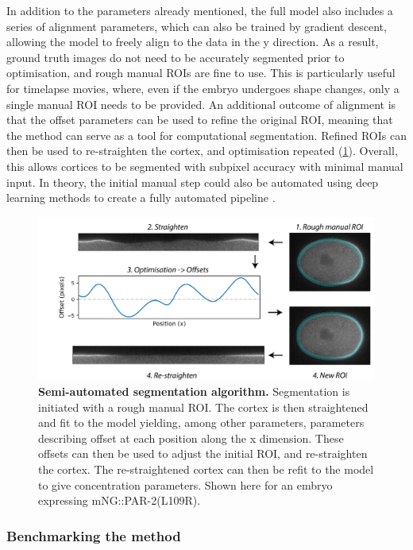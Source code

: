\documentclass[12pt]{"article"}
\newcommand{\mycaption}[2]{\caption[#1]{\textbf{#1.} #2}}
\begin{document}
In addition to the parameters already mentioned, the full model also includes a series of alignment parameters, which can also be trained by gradient descent, allowing the model to freely align to the data in the y direction. As a result, ground truth images do not need to be accurately segmented prior to optimisation, and rough manual ROIs are fine to use. This is particularly useful for timelapse movies, where, even if the embryo undergoes shape changes, only a single manual ROI needs to be provided. An additional outcome of alignment is that the offset parameters can be used to refine the original ROI, meaning that the method can serve as a tool for computational segmentation. Refined ROIs can then be used to re-straighten the cortex, and optimisation repeated (\cref{fig:memquant_segmentation}). Overall, this allows cortices to be segmented with subpixel accuracy with minimal manual input. In theory, the initial manual step could also be automated using deep learning methods to create a fully automated pipeline \citep{Minaee2021}.\\

\begin{figure}
\includegraphics[scale=1]{memquant_segmentation}
\centering
\mycaption{Semi-automated segmentation algorithm}{
Segmentation is initiated with a rough manual ROI. The cortex is then straightened and fit to the model yielding, among other parameters, parameters describing offset at each position along the x dimension. These offsets can then be used to adjust the initial ROI, and re-straighten the cortex. The re-straightened cortex can then be refit to the model to give concentration parameters. Shown here for an embryo expressing mNG::PAR-2(L109R).
}
\label{fig:memquant_segmentation}
\end{figure}


\subsubsection{Benchmarking the method}
\end{document}
